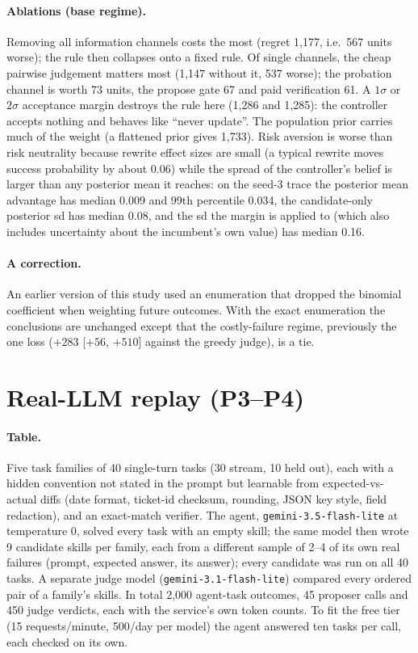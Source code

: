 \documentclass[11pt]{article}
\begin{document}
\paragraph{Ablations (base regime).}
Removing all information channels costs the most (regret 1,177, i.e.\ 567 units worse); the
rule then collapses onto a fixed rule.  Of single channels, the cheap pairwise judgement
matters most (1,147 without it, 537 worse); the probation channel is worth 73 units, the
propose gate 67 and paid verification 61.  A $1\sigma$ or $2\sigma$ acceptance margin destroys
the rule here (1,286 and 1,285): the controller accepts nothing and behaves like ``never
update''.  The population prior carries much of the weight (a flattened prior gives 1,733).
Risk aversion is worse than risk neutrality because rewrite effect sizes are small (a typical
rewrite moves success probability by about 0.06) while the spread of the controller's belief
is larger than any posterior mean it reaches: on the seed-3 trace the posterior mean
advantage has median 0.009 and 99th percentile 0.034, the candidate-only posterior sd has
median 0.08, and the sd the margin is applied to (which also includes uncertainty about the
incumbent's own value) has median 0.16.

\paragraph{A correction.}  An earlier version of this study used an enumeration that dropped
the binomial coefficient when weighting future outcomes.  With the exact enumeration the
conclusions are unchanged except that the costly-failure regime, previously the one loss
($+283$ [$+56$, $+510$] against the greedy judge), is a tie.

\section{Real-LLM replay (P3--P4)}
\label{sec:replay}
\paragraph{Table.}  Five task families of 40 single-turn tasks (30 stream, 10 held out), each
with a hidden convention not stated in the prompt but learnable from expected-vs-actual
diffs (date format, ticket-id checksum, rounding, JSON key style, field redaction), and an
exact-match verifier.  The agent, \texttt{gemini-3.5-flash-lite} at temperature 0, solved
every task with an empty skill; the same model then wrote 9 candidate skills per family, each
from a different sample of 2--4 of its own real failures (prompt, expected answer, its
answer); every candidate was run on all 40 tasks.  A separate judge model
(\texttt{gemini-3.1-flash-lite}) compared every ordered pair of a family's skills.  In total
2,000 agent-task outcomes, 45 proposer calls and 450 judge verdicts, each with the service's
own token counts.  To fit the free tier (15 requests/minute, 500/day per model) the agent
answered ten tasks per call, each checked on its own.
\end{document}
